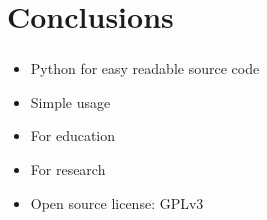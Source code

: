 \documentclass[mathserif,svgnames]{beamer}
\begin{document}
\section{Conclusions}
\begin{frame} 
\frametitle{\insertsection} 
\begin{itemize}
    \item Python for easy readable source code \visible<2->{$\checkmark$}
    \item Simple usage 
    \item For education 
    \item For research 
    \item Open source license: GPLv3 
\end{itemize}
\end{frame}



%
%
%
%
%
%
%
\end{document}
